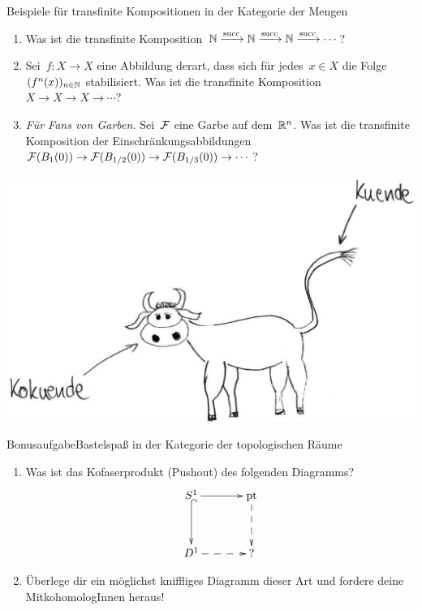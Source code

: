 \documentclass{uebblatt}
\newcommand{\sukk}{\mathrm{succ}}
\begin{document}
\begin{aufgabe}{Beispiele für transfinite Kompositionen in der Kategorie der Mengen}
\begin{enumerate}
\item Was ist die transfinite Komposition~$\NN \xra{\sukk} \NN \xra{\sukk} \NN
\xra{\sukk} \cdots$?
\item Sei~$f : X \to X$ eine Abbildung derart, dass sich für jedes~$x \in X$
die Folge~$(f^n(x))_{n \in \mathbb{N}}$ stabilisiert. Was ist die transfinite
Komposition~$X \to X \to X \to \cdots$?
\item \emph{Für Fans von Garben.} Sei~$\mathcal{F}$ eine Garbe auf dem~$\mathbb{R}^n$. Was ist
die transfinite Komposition der Einschränkungsabbildungen~$\mathcal{F}(B_1(0)) \to
\mathcal{F}(B_{1/2}(0)) \to \mathcal{F}(B_{1/3}(0)) \to \cdots$?
\end{enumerate}
\end{aufgabe}

{\centering
\includegraphics[scale=0.6]{images/kuende}
\par}

\newpage
\SetWatermarkText{}

\begin{aufgabe*}{Bonusaufgabe}{Bastelspaß in der Kategorie der topologischen Räume}
\begin{enumerate}
\item Was ist das Kofaserprodukt (Pushout) des folgenden Diagramms?
\[ \xymatrixcolsep{3pc}\xymatrixrowsep{3pc}\xymatrix{
  S^1 \ar[r] \ar@{^{(}->}[d] & \mathrm{pt} \ar@{-->}[d] \\
  D^1 \ar@{-->}[r] & ?
} \]
\item Überlege dir ein möglichst kniffliges Diagramm dieser Art und fordere
deine MitkohomologInnen heraus!
\end{enumerate}
\end{aufgabe*}
\end{document}
